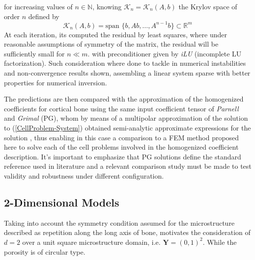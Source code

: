 {for increasing values of $n \in \mathbb{N}$, knowing $\mathcal{K}_n = \mathcal{K}_n(A,b)$ the Krylov space of order $n$ defined by
\begin{equation*}
 \mathcal{K}_n(A,b) = \text{span }\{ b, Ab, \dots, A^{n-1}b \} \subset \mathbb{R}^m   
\end{equation*}
At each iteration, its computed the residual by least squares, where under reasonable assumptions of symmetry of the matrix, the residual will be sufficiently small for $n \ll m$.} with preconditioner given by \textit{iLU} (incomplete LU factorization). Such consideration where done to tackle in numerical instabilities and non-convergence results shown, assembling a linear system sparse with better properties for numerical inversion.

The predictions are then compared with the approximation of the homogenized coefficients for cortical bone using the same input coefficient tensor of \textit{Parnell} and \textit{Grimal} (PG), whom by means of a multipolar approximation of the solution to (\ref{CellProblem-System}) obtained semi-analytic approximate expressions for the solution \cite{Parnell2008}, thus enabling in this case a comparison to a FEM method proposed here to solve each of the cell problems involved in the homogenized coefficient description. It's important to emphasize that PG solutions define the standard reference used in literature and a relevant comparison study must be made to test validity and robustness under different configuration.

\subsection{2-Dimensional Models}
Taking into account the symmetry condition assumed for the microstructure described as repetition along the long axis of bone, motivates the consideration of $d = 2$ over a unit square microstructure domain, i.e. $\mathbf{Y} = (0,1)^2$. While the porosity is of circular type.

